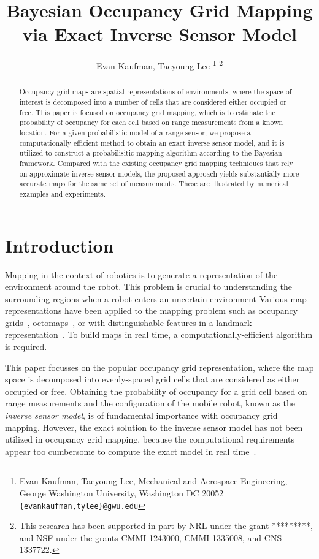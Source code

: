 \documentclass[letterpaper, 10pt, conference]{ieeeconf}
\title{\LARGE \bf
Bayesian Occupancy Grid Mapping via Exact Inverse Sensor Model}
\author{Evan Kaufman, Taeyoung Lee%
\thanks{Evan Kaufman, Taeyoung Lee, Mechanical and Aerospace Engineering, George Washington University, Washington DC 20052 {\tt \{evankaufman,tylee\}@gwu.edu}}
\thanks{This research has been supported in part by NRL under the grant *********, and NSF under the grants CMMI-1243000, CMMI-1335008, and CNS-1337722.}
}
\newcommand{\EditTL}[1]{{\color{red}\protect #1}}
\begin{document}
\allowdisplaybreaks


\maketitle \thispagestyle{empty} \pagestyle{empty}

\begin{abstract}
Occupancy grid maps are spatial representations of environments, where the space of interest is decomposed into a number of cells that are considered either occupied or free. This paper is focused on occupancy grid mapping, which is to estimate the probability of occupancy for each cell based on range measurements from a known location. For a given probabilistic model of a range sensor, we propose a computationally efficient method to obtain an exact inverse sensor model, and it is utilized to construct a probabilisitic mapping algorithm according to the Bayesian framework. Compared with the existing occupancy grid mapping techniques that rely on approximate inverse sensor models, the proposed approach yields substantially more accurate maps for the same set of measurements. These are illustrated by numerical examples and experiments. 
\end{abstract}

\section{Introduction}

Mapping in the context of robotics is to generate a representation of the environment around the robot.
This problem is crucial to understanding the surrounding regions when a robot enters an uncertain environment
Various map representations have been applied to the mapping problem such as occupancy grids~\cite{WolSuk05}, octomaps~\cite{WurHorBenStaBur10}, or with distinguishable features in a landmark representation~\cite{MonThrKolWeg02}.
To build maps in real time, a computationally-efficient algorithm is required.%

This paper focusses on the popular occupancy grid representation, where the map space is decomposed into evenly-spaced grid cells that are considered as either occupied or free. Obtaining the probability of occupancy for a grid cell based on range measurements and the configuration of the mobile robot, known as the \emph{inverse sensor model}, is of fundamental importance with occupancy grid mapping. However, the exact solution to the inverse sensor model has not been utilized in occupancy grid mapping, because the computational requirements appear too cumbersome to compute the exact model in real time~\cite{ThrBurFox05}.
\end{document}
